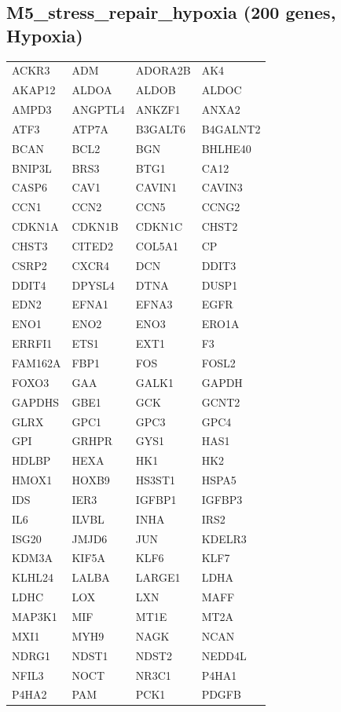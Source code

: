 \subsection*{M5\_stress\_repair\_hypoxia (200 genes, Hypoxia)}
\begin{longtable}{llll}
ACKR3 & ADM & ADORA2B & AK4 \\
AKAP12 & ALDOA & ALDOB & ALDOC \\
AMPD3 & ANGPTL4 & ANKZF1 & ANXA2 \\
ATF3 & ATP7A & B3GALT6 & B4GALNT2 \\
BCAN & BCL2 & BGN & BHLHE40 \\
BNIP3L & BRS3 & BTG1 & CA12 \\
CASP6 & CAV1 & CAVIN1 & CAVIN3 \\
CCN1 & CCN2 & CCN5 & CCNG2 \\
CDKN1A & CDKN1B & CDKN1C & CHST2 \\
CHST3 & CITED2 & COL5A1 & CP \\
CSRP2 & CXCR4 & DCN & DDIT3 \\
DDIT4 & DPYSL4 & DTNA & DUSP1 \\
EDN2 & EFNA1 & EFNA3 & EGFR \\
ENO1 & ENO2 & ENO3 & ERO1A \\
ERRFI1 & ETS1 & EXT1 & F3 \\
FAM162A & FBP1 & FOS & FOSL2 \\
FOXO3 & GAA & GALK1 & GAPDH \\
GAPDHS & GBE1 & GCK & GCNT2 \\
GLRX & GPC1 & GPC3 & GPC4 \\
GPI & GRHPR & GYS1 & HAS1 \\
HDLBP & HEXA & HK1 & HK2 \\
HMOX1 & HOXB9 & HS3ST1 & HSPA5 \\
IDS & IER3 & IGFBP1 & IGFBP3 \\
IL6 & ILVBL & INHA & IRS2 \\
ISG20 & JMJD6 & JUN & KDELR3 \\
KDM3A & KIF5A & KLF6 & KLF7 \\
KLHL24 & LALBA & LARGE1 & LDHA \\
LDHC & LOX & LXN & MAFF \\
MAP3K1 & MIF & MT1E & MT2A \\
MXI1 & MYH9 & NAGK & NCAN \\
NDRG1 & NDST1 & NDST2 & NEDD4L \\
NFIL3 & NOCT & NR3C1 & P4HA1 \\
P4HA2 & PAM & PCK1 & PDGFB \\

\end{longtable}
